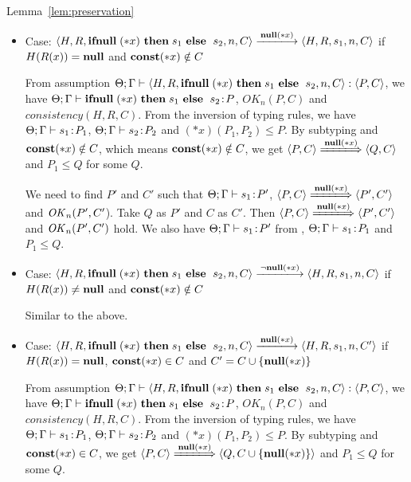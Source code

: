 \begin{pfof}{Lemma~\ref{lem:preservation}}
\begin{itemize}
  Similar to the above.

\item Case: \(\langle H, R, \IFNULL \Sirx \ \THEN s_{1} \ \ELSE
  \ s_{2}, n, C\rangle \xlongrightarrow{\snull} \langle H, R, s_{1}, n, C \rangle\)
  if \(H(R(x)) = \mathbf{null}\) and \(\mathbf{const}(*x) \notin C\)

  From assumption \( \Theta; \Gamma \vdash \langle H, R, \mathbf{ifnull}\;(*x)
  \ \mathbf{then}\; s_{1} \ \mathbf{else}\; \ s_{2}, n, C \rangle : \langle P, C
  \rangle\), we have \(\Theta; \Gamma \vdash \mathbf{ifnull}\;(*x) \ \mathbf{then}\;
  s_{1} \ \mathbf{else}\; \ s_{2} \!:\! P \), \(OK_n(P, C)\) and \(consistency(H,
  R, C)\). From the inversion of typing rules, we have \(\Theta;
  \Gamma \vdash s_{1} \!:\! P_1\), \(\Theta; \Gamma \vdash s_{2} \!:\!
  P_2\) and \((*x)(P_1, P_2) \le P\). By subtyping and \(\mathbf{const}(*x)
  \notin C\), which means \(\mathbf{const}(*x) \notin C\), we get \(\langle P,
  C \rangle \xLongrightarrow{\snull} \langle Q, C \rangle \) and \(P_1
  \le Q\) for some \(Q\).

  We need to find \(P'\) and \(C'\) such that \(\Theta;\Gamma \vdash
  s_1\!:\! P'\), \( \langle P, C \rangle \xLongrightarrow{\snull}
  \langle P', C' \rangle\) and \(\mathit{OK}_n(P', C'\)). Take \(Q\) as \(P'\)
  and \(C\) as \(C'\). Then \( \langle P,C \rangle
  \xLongrightarrow{\snull} \langle P', C' \rangle\) and \(\mathit{OK}_n(P',
  C')\) hold.  We also have \(\Theta; \Gamma \vdash s_1 \!:\! P'\) from
  , \(\Theta; \Gamma \vdash s_1 \!:\! P_1\) and \( P_1 \le
  Q\).

\item Case: \(\langle H, R, \IFNULL \Sirx \ \THEN s_{1} \ \ELSE
  \ s_{2}, n, C\rangle \xlongrightarrow{\snnull} \langle H, R, s_{1}, n, C \rangle\)
  if \(H(R(x)) \neq \mathbf{null}\) and \(\mathbf{const}(*x) \notin C\)

    Similar to the above.
  
\item Case: \(\langle H, R, \IFNULL \Sirx \ \THEN s_{1} \ \ELSE
  \ s_{2}, n, C\rangle \xlongrightarrow{\snull} \langle H, R, s_{1}, n, C'
  \rangle\) if \(H(R(x)) = \mathbf{null}\), \(\mathbf{const}(*x) \in C\) and \(C' = C
  \cup \{{\bf null}(*x)\}\)

  From assumption \( \Theta; \Gamma \vdash \langle H, R, \mathbf{ifnull}\;(*x)
  \ \mathbf{then}\; s_{1} \ \mathbf{else}\; \ s_{2}, n, C \rangle : \langle P, C
  \rangle\), we have \(\Theta; \Gamma \vdash \mathbf{ifnull}\;(*x) \ \mathbf{then}\;
  s_{1} \ \mathbf{else}\; \ s_{2} \!:\! P \), \(OK_n(P, C)\) and \(consistency(H,
  R, C)\). From the inversion of typing rules, we have \(\Theta;
  \Gamma \vdash s_{1} \!:\! P_1\), \(\Theta; \Gamma \vdash s_{2} \!:\!
  P_2\) and \((*x)(P_1, P_2) \le P\). By subtyping and \(\mathbf{const}(*x)
  \in C\), we get \(\langle P, C \rangle \xLongrightarrow{\snull}
  \langle Q, C\cup \{\snull\} \rangle \) and \(P_1 \le Q\) for some
  \(Q\).
  

\end{itemize}
\end{pfof}
